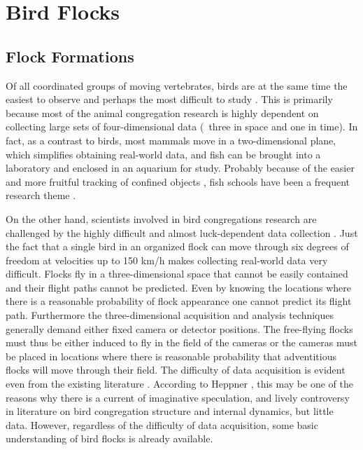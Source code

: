 \graphicspath{{img/}}





\chapter{Bird Flocks}
\label{chap:birdFlocks}


\section{Flock Formations}
Of all coordinated groups of moving vertebrates, birds are at the same time the easiest to observe and perhaps the most difficult to study \cite{heppner:1997}. This is primarily because most of the animal congregation research is highly dependent on collecting \cite{heppner:1997,jaffe:1997} large sets of four-dimensional data (\ie\ three in space and one in time). In fact, as a contrast to birds, most mammals move in a two-dimensional plane, which simplifies obtaining real-world data, and fish can be brought into a laboratory and enclosed in an aquarium for study. Probably because of the easier and more fruitful tracking of confined objects \cite{heppner:1997,parrish:1997a}, fish schools have been a frequent research theme \cite{aoki:1982,dill:1997,mcfarland:1997,partridge:1982,shaw:1962,terzopoulos:1994,tu:1994,tu:1999,ward:2001,zaera:1996}. 

On the other hand, scientists involved in bird congregations research are challenged by the highly difficult and almost luck-dependent data collection \cite{heppner:1997}. Just the fact that a single bird in an organized flock can move through six degrees of freedom at velocities up to 150 km/h makes collecting real-world data very difficult. Flocks fly in a three-dimensional space that cannot be easily contained and their flight paths cannot be predicted. Even by knowing the locations where there is a reasonable probability of flock appearance one cannot predict its flight path. Furthermore the three-dimensional acquisition and analysis techniques generally demand either fixed camera or detector positions. The free-flying flocks must thus be either induced to fly in the field of the cameras or the cameras must be placed in locations where there is reasonable probability that adventitious flocks will move through their field. The difficulty of data acquisition is evident even from the existing literature \cite{gould:1974,heppner:1997,jaffe:1997,moyle:1998}. According to Heppner \cite{heppner:1997}, this may be one of the reasons why there is a current of imaginative speculation, and lively controversy in literature on bird congregation structure and internal dynamics, but little data. However, regardless of the difficulty of data acquisition, some basic understanding of bird flocks is already available. 

